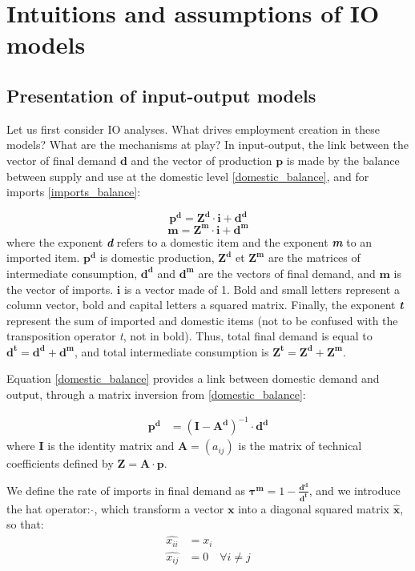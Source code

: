\section{Intuitions and assumptions of IO models} \label{sec:intuition}

\subsection{Presentation of input-output models}
Let us first consider IO analyses. What drives employment creation in these models? What are the mechanisms at play?
In input-output, the link between the vector of final demand $\pmb{d}$ and the vector of production $\pmb{p}$ is made by the balance between supply and use at the domestic level \eqref{domestic_balance}, and for imports \eqref{imports_balance}:

\begin{equation}
\pmb{p^d} = \pmb{Z^d} \cdot \pmb{i} + \pmb{d^d}	
\label{domestic_balance}
\end{equation}
\begin{equation}
\pmb{m} = \pmb{Z^m} \cdot \pmb{i} + \pmb{d^m}	
\label{imports_balance}
\end{equation}
where the exponent \textit{\textbf{d}} refers to a domestic item and the exponent \textit{\textbf{m}} to an imported item. 
$\pmb{p^d}$ is domestic production, $\pmb{Z^d}$ et $\pmb{Z^m}$ are the matrices of intermediate consumption, $\pmb{d^d}$ and $\pmb{d^m}$ are the vectors of final demand, and $\pmb{m}$ is the vector of imports. 
$\pmb{i}$ is a vector made of 1. 
Bold and small letters represent a column vector, bold and capital letters a squared matrix. Finally, the exponent \textit{\textbf{t}} represent the sum of imported and domestic items (not to be confused with the transposition operator \textit{t}, not in bold). Thus, total final demand is equal to $\pmb{d^t=d^d+d^m}$, and total intermediate consumption is $\pmb{Z^t=Z^d+Z^m}$.

Equation \ref{domestic_balance} provides a link between domestic demand and output, through a matrix inversion from \ref{domestic_balance}:

\begin{align*}
	\pmb{p^d} &= (\pmb{I} - \pmb{A^d})^{-1} \cdot \pmb{d^d}	
\end{align*}
where $\pmb{I}$ is the identity matrix and $\pmb{A}= (a_{ij})$ is the matrix of technical coefficients defined by $\pmb{Z} = \pmb{A} \cdot \pmb{p}$.

We define the rate of imports in final demand as $\pmb{\tau^m} = 1- \frac{\pmb{d^d}}{\pmb{d^t}}$, and we introduce the hat operator: $\widehat{  }$, which transform a vector $\pmb{x}$ into a diagonal squared matrix $\pmb{\hat{x}}$, so that:
\begin{align*}
	\widehat{x_{ii}} &=x_i \\
	\widehat{x_{ij}} &=0 \quad \forall i \ne j
\end{align*}


